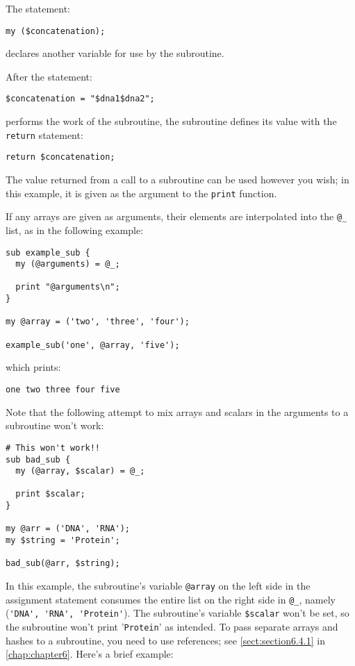 The statement:

\begin{lstlisting}
my ($concatenation);
\end{lstlisting}

declares another variable for use by the subroutine.

After the statement:

\begin{lstlisting}
$concatenation = "$dna1$dna2"; 
\end{lstlisting}

performs the work of the subroutine, the subroutine defines its value with the \verb|return| statement:

\begin{lstlisting}
return $concatenation;
\end{lstlisting}

The value returned from a call to a subroutine can be used however you wish; in this example, it is given as the argument to the \verb|print| function.

If any arrays are given as arguments, their elements are interpolated into the \verb|@_| list, as in the following example:

\begin{lstlisting}
sub example_sub {
  my (@arguments) = @_;

  print "@arguments\n";
}

my @array = ('two', 'three', 'four');

example_sub('one', @array, 'five');
\end{lstlisting}

which prints:
 
\begin{lstlisting}
one two three four five
\end{lstlisting}

Note that the following attempt to mix arrays and scalars in the arguments to a subroutine won't work:

\begin{lstlisting}
# This won't work!!
sub bad_sub {
  my (@array, $scalar) = @_;

  print $scalar;
}

my @arr = ('DNA', 'RNA');
my $string = 'Protein';

bad_sub(@arr, $string);
\end{lstlisting}

In this example, the subroutine's variable \verb|@array| on the left side in the assignment statement consumes the entire list on the right side in \verb|@_|, namely (\verb|'DNA', 'RNA', 'Protein'|). The subroutine's variable \verb|$scalar| won't be set, so the subroutine won't print '\verb|Protein|' as intended. To pass separate arrays and hashes to a subroutine, you need to use references; see \autoref{sect:section6.4.1} in \autoref{chap:chapter6}. Here's a brief example:

